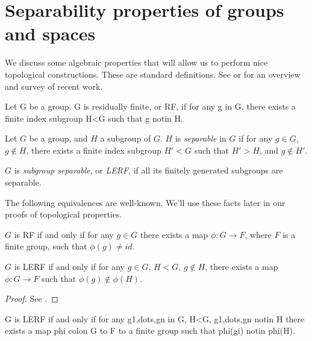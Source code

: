 \section{Separability properties of groups and spaces}

We discuss some algebraic properties that will allow us to perform nice
topological constructions. These are standard definitions. See \cite{LR} or
\cite{AFW} for an overview and survey of recent work.

\begin{defn}

Let G be a group. G is residually finite, or RF, if for any g in G, there
exists a finite index subgroup H<G such that g notin H.

Let $G$ be a group, and $H$ a subgroup of $G$. $H$ is \emph{separable} in $G$
if for any $g \in G$, $g \notin H$, there exists a finite index subgroup $H'<G$
such that $H'>H$, and $g \notin H'$.

$G$ is \emph{subgroup separable}, or \emph{LERF}, if all its finitely generated
subgroups are separable.

\end{defn}

The following equivalences are well-known.  We'll use these facts later in our
proofs of topological properties.

\begin{prop}\label{P:lerfmap}

$G$ is RF if and only if for any $g \in G$ there exists a map $\phi \colon
G \to F$, where $F$ is a finite group, such that $\phi(g) \neq id$.

$G$ is LERF if and only if for any $g \in G$, $H < G$, $g \notin H$, there
exists a map $\phi \colon G \to F$ such that $\phi(g) \notin \phi(H)$.

\end{prop}

\begin{proof}

See \cite{LR}.

\end{proof}

\begin{cor}\label{C:lerfmap'}

G is LERF if and only if for any g1,dots,gn in G, H<G, g1,dots,gn notin H there
exists a map phi colon G to F to a finite group such that phi(gi) notin phi(H).

\end{cor}

